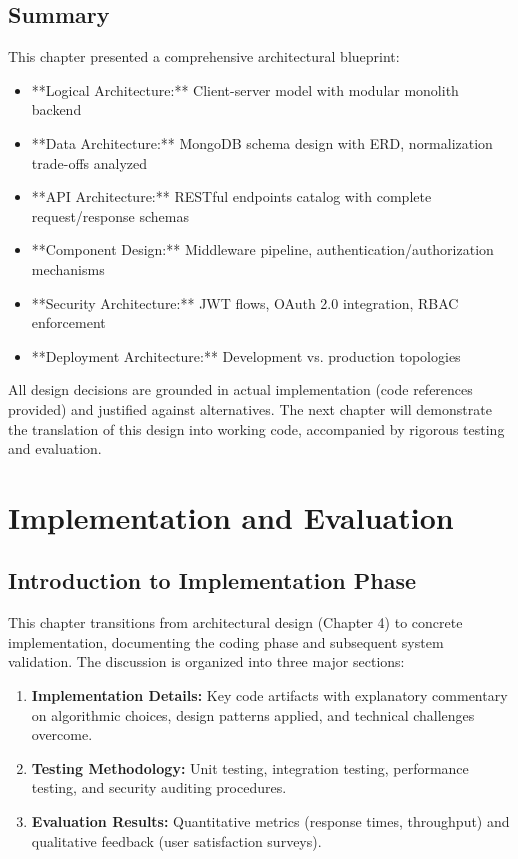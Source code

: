 \documentclass[12pt, a4paper]{report}
\begin{document}
\section{Summary}

This chapter presented a comprehensive architectural blueprint:

\begin{itemize}
    \item **Logical Architecture:** Client-server model with modular monolith backend
    \item **Data Architecture:** MongoDB schema design with ERD, normalization trade-offs analyzed
    \item **API Architecture:** RESTful endpoints catalog with complete request/response schemas
    \item **Component Design:** Middleware pipeline, authentication/authorization mechanisms
    \item **Security Architecture:** JWT flows, OAuth 2.0 integration, RBAC enforcement
    \item **Deployment Architecture:** Development vs. production topologies
\end{itemize}

All design decisions are grounded in actual implementation (code references provided) and justified against alternatives. The next chapter will demonstrate the translation of this design into working code, accompanied by rigorous testing and evaluation.


\chapter{Implementation and Evaluation}

\section{Introduction to Implementation Phase}

This chapter transitions from architectural design (Chapter 4) to concrete implementation, documenting the coding phase and subsequent system validation. The discussion is organized into three major sections:

\begin{enumerate}
    \item \textbf{Implementation Details:} Key code artifacts with explanatory commentary on algorithmic choices, design patterns applied, and technical challenges overcome.
    \item \textbf{Testing Methodology:} Unit testing, integration testing, performance testing, and security auditing procedures.
    \item \textbf{Evaluation Results:} Quantitative metrics (response times, throughput) and qualitative feedback (user satisfaction surveys).
\end{enumerate}
\end{document}
